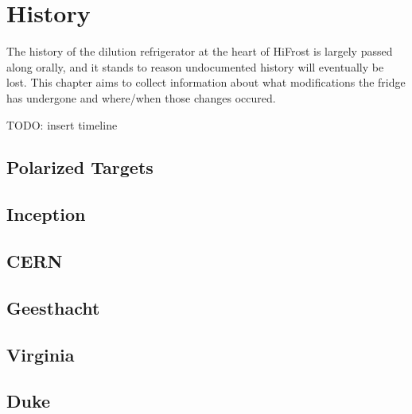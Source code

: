 \chapter{History} 
\label{history} 
The history of the dilution refrigerator at the heart of HiFrost is largely passed along orally, and it stands to reason undocumented history will eventually be lost.  This chapter aims to collect information about what modifications the fridge has undergone and where/when those changes occured. 



TODO: insert timeline 
\section{Polarized Targets}

\section{Inception}  
 
\section{CERN} 
 
\section{Geesthacht} 

\section{Virginia}

\section{Duke}